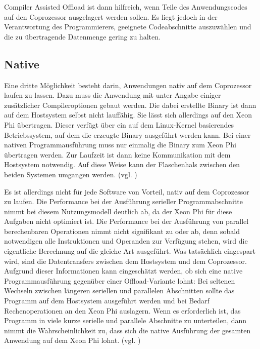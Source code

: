 \documentclass[../main.tex]{subfiles}
\begin{document}
Compiler Assisted Offload ist dann hilfreich, wenn Teile des Anwendungscodes auf den Coprozessor ausgelagert werden sollen. Es liegt jedoch in der Verantwortung des Programmierers, geeignete Codeabschnitte auszuwählen und die zu übertragende Datenmenge gering zu halten. 

\subsection{Native}
Eine dritte Möglichkeit besteht darin, Anwendungen nativ auf dem Coprozessor laufen zu lassen. Dazu muss die Anwendung mit unter Angabe einiger zusätzlicher Compileroptionen gebaut werden. Die dabei erstellte Binary ist dann auf dem Hostsystem selbst nicht lauffähig. Sie lässt sich allerdings auf den Xeon Phi übertragen. Dieser verfügt über ein auf dem Linux-Kernel basierendes Betriebssystem, auf dem die erzeugte Binary ausgeführt werden kann. Bei einer nativen Programmausführung muss nur einmalig die Binary zum Xeon Phi übertragen werden. Zur Laufzeit ist dann keine Kommunikation mit dem Hostsystem notwendig. Auf diese Weise kann der Flaschenhals zwischen den beiden Systemen umgangen werden. (vgl. \cite{xeonphiQuickstart})

Es ist allerdings nicht für jede Software von Vorteil, nativ auf dem Coprozessor zu laufen. Die Performance bei der Ausführung serieller Programmabschnitte nimmt bei diesem Nutzungsmodell deutlich ab, da der Xeon Phi für diese Aufgaben nicht optimiert ist. Die Performance bei der Ausführung von parallel berechenbaren Operationen nimmt nicht signifikant zu oder ab, denn sobald notwendigen alle Instruktionen und Operanden zur Verfügung stehen, wird die eigentliche Berechnung auf die gleiche Art ausgeführt. Was tatsächlich eingespart wird, sind die Datentransfers zwischen dem Hostsystem und dem Coprozessor. Aufgrund dieser Informationen kann eingeschätzt werden, ob sich eine native Programmausführung gegenüber einer Offload-Variante lohnt: Bei seltenen Wechseln zwischen längeren seriellen und parallelen Abschnitten sollte das Programm auf dem Hostsystem ausgeführt werden und bei Bedarf Rechenoperationen an den Xeon Phi auslagern. Wenn es erforderlich ist, das Programm in viele kurze serielle und parallele Abschnitte zu unterteilen, dann nimmt die Wahrscheinlichkeit zu, dass sich die native Ausführung der gesamten Anwendung auf dem Xeon Phi lohnt. (vgl. \cite{xeonphiQuickstart})
\end{document}

